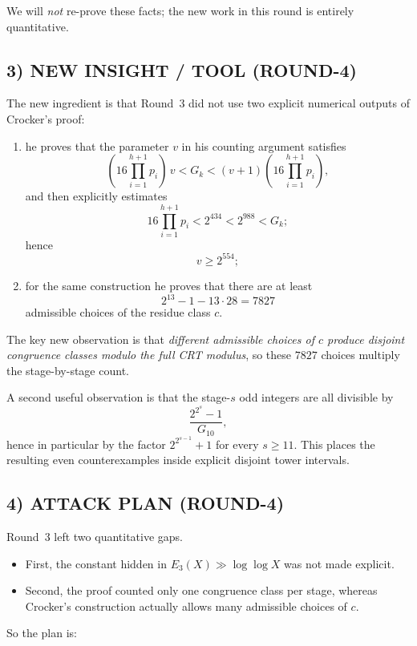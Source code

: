 We will \emph{not} re-prove these facts; the new work in this round is entirely quantitative.

\subsection{3) NEW INSIGHT / TOOL (ROUND-4)}

The new ingredient is that Round~3 did not use two explicit numerical outputs of Crocker's proof:

\begin{enumerate}
\item he proves that the parameter $v$ in his counting argument satisfies
\[
(16\prod_{i=1}^{h+1}p_i)\,v<G_k<(v+1)(16\prod_{i=1}^{h+1}p_i),
\]
and then explicitly estimates
\[
16\prod_{i=1}^{h+1}p_i<2^{434}<2^{988}<G_k;
\]
hence
\[
v\ge 2^{554};
\]
\item for the same construction he proves that there are at least
\[
2^{13}-1-13\cdot 28=7827
\]
admissible choices of the residue class $c$.
\end{enumerate}

The key new observation is that \emph{different admissible choices of $c$ produce disjoint congruence classes modulo the full CRT modulus}, so these $7827$ choices multiply the stage-by-stage count.

A second useful observation is that the stage-$s$ odd integers are all divisible by
\[
\frac{2^{2^s}-1}{G_{10}},
\]
hence in particular by the factor $2^{2^{s-1}}+1$ for every $s\ge 11$. This places the resulting even counterexamples inside explicit disjoint tower intervals.

\subsection{4) ATTACK PLAN (ROUND-4)}

Round~3 left two quantitative gaps.

\begin{itemize}
\item First, the constant hidden in $E_3(X)\gg \log\log X$ was not made explicit.
\item Second, the proof counted only one congruence class per stage, whereas Crocker's construction actually allows many admissible choices of $c$.
\end{itemize}

So the plan is:

